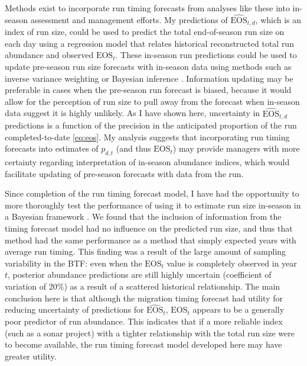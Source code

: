 \documentclass[12pt,]{book}
\theoremstyle{definition}
\theoremstyle{definition}
\theoremstyle{definition}
\theoremstyle{remark}
\begin{document}
Methods exist to incorporate run timing forecasts from analyses like
these into in-season assessment and management efforts. My predictions
of \(\widehat{\text{EOS}}_{t,d}\), which is an index of run size, could
be used to predict the total end-of-season run size on each day using a
regression model that relates historical reconstructed total run
abundance and observed \(\text{EOS}_t\). These in-season run predictions
could be used to update pre-season run size forecasts with in-season
data using methods such as inverse variance weighting
\citep[\emph{e}.\emph{g}.,][]{walters-buckingham-1975} or Bayesian
inference \citep[\emph{e}.\emph{g}.,][]{fried-hilborn-1988}. Information
updating may be preferable in cases when the pre-season run forecast is
biased, because it would allow for the perception of run size to pull
away from the forecast when in-season data suggest it is highly
unlikely. As I have shown here, uncertainty in
\(\widehat{\text{EOS}}_{t,d}\) predictions is a function of the
precision in the anticipated proportion of the run completed-to-date
\eqref{eq:eos}. My analysis suggests that incorporating run timing
forecasts into estimates of \(p_{d,t}\) (and thus \(\text{EOS}_t\)) may
provide managers with more certainty regarding interpretation of
in-season abundance indices, which would facilitate updating of
pre-season forecasts with data from the run.

Since completion of the run timing forecast model, I have had the
opportunity to more thoroughly test the performance of using it to
estimate run size in-season in a Bayesian framework
\citep{staton-catalano-2019}. We found that the inclusion of information
from the timing forecast model had no influence on the predicted run
size, and thus that method had the same performance as a method that
simply expected years with average run timing. This finding was a result
of the large amount of sampling variability in the BTF: even when the
\(\text{EOS}_{t}\) value is completely observed in year \(t\), posterior
abundance predictions are still highly uncertain (coefficient of
variation of 20\%) as a result of a scattered historical relationship.
The main conclusion here is that although the migration timing forecast
had utility for reducing uncertainty of predictions for
\(\widehat{\text{EOS}}_t\), \(\text{EOS}_t\) appears to be a generally
poor predictor of run abundance. This indicates that if a more reliable
index (such as a sonar project) with a tighter relationship with the
total run size were to become available, the run timing forecast model
developed here may have greater utility.
\end{document}
